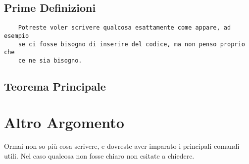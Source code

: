 \subsection{Prime Definizioni}
\begin{Verbatim}
    Potreste voler scrivere qualcosa esattamente come appare, ad esempio
    se ci fosse bisogno di inserire del codice, ma non penso proprio che
    ce ne sia bisogno.
\end{Verbatim}

\subsection{Teorema Principale}


\section{Altro Argomento}
Ormai non so più cosa scrivere, e dovreste aver imparato i principali comandi
utili. Nel caso qualcosa non fosse chiaro non esitate a chiedere.

